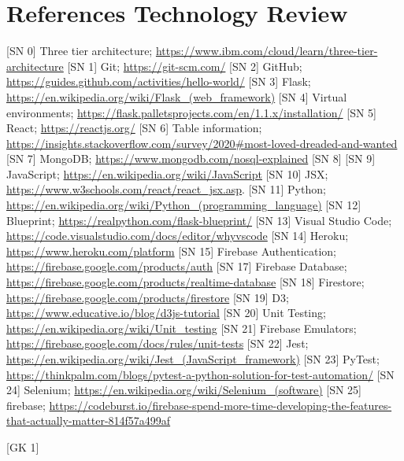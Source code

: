 \chapter{References Technology Review}
[SN 0] Three tier architecture; \url{https://www.ibm.com/cloud/learn/three-tier-architecture}
[SN 1] Git; \url{https://git-scm.com/}
[SN 2] GitHub; \url{https://guides.github.com/activities/hello-world/}
[SN 3] Flask; \url{https://en.wikipedia.org/wiki/Flask_(web_framework)}
[SN 4] Virtual environments; \url{https://flask.palletsprojects.com/en/1.1.x/installation/}
[SN 5] React;  \url{https://reactjs.org/}
[SN 6] Table information; \url{https://insights.stackoverflow.com/survey/2020#most-loved-dreaded-and-wanted}
[SN 7] MongoDB; \url{https://www.mongodb.com/nosql-explained}
[SN 8]
[SN 9] JavaScript; \url{https://en.wikipedia.org/wiki/JavaScript}
[SN 10] JSX; \url{https://www.w3schools.com/react/react_jsx.asp}.
[SN 11] Python; \url{https://en.wikipedia.org/wiki/Python_(programming_language)}
[SN 12] Blueprint; \url{https://realpython.com/flask-blueprint/}
[SN 13] Visual Studio Code; \url{https://code.visualstudio.com/docs/editor/whyvscode}
[SN 14] Heroku; \url{https://www.heroku.com/platform}
[SN 15] Firebase Authentication; \url{https://firebase.google.com/products/auth}
[SN 17] Firebase Database; \url{https://firebase.google.com/products/realtime-database}
[SN 18] Firestore; \url{https://firebase.google.com/products/firestore}
[SN 19] D3; \url{https://www.educative.io/blog/d3js-tutorial}
[SN 20] Unit Testing; \url{https://en.wikipedia.org/wiki/Unit_testing}
[SN 21] Firebase Emulators; \url{https://firebase.google.com/docs/rules/unit-tests}
[SN 22] Jest; \url{https://en.wikipedia.org/wiki/Jest_(JavaScript_framework)}
[SN 23] PyTest; \url{https://thinkpalm.com/blogs/pytest-a-python-solution-for-test-automation/}
[SN 24] Selenium; \url{https://en.wikipedia.org/wiki/Selenium_(software)}
[SN 25] firebase; \url{https://codeburst.io/firebase-spend-more-time-developing-the-features-that-actually-matter-814f57a499af}

[GK 1] 
